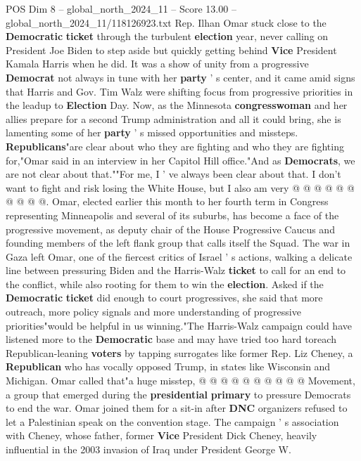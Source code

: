 \begin{textsample}{POS Dim 8 – global\_north\_2024\_11 – Score 13.00 – global\_north\_2024\_11/118126923.txt}  \label{ex:f8_pos_151}
Rep.
Ilhan Omar stuck close to the \textbf{Democratic} \textbf{ticket} through the turbulent \textbf{election} year, never calling on President Joe Biden to step aside but quickly getting behind \textbf{Vice} President Kamala Harris when he did.
It was a show of unity from a progressive \textbf{Democrat} not always in tune with her \textbf{party} ' s center, and it came amid signs that Harris and Gov.
Tim Walz were shifting focus from progressive priorities in the leadup to \textbf{Election} Day.
Now, as the Minnesota \textbf{congresswoman} and her allies prepare for a second Trump administration and all it could bring, she is lamenting some of her \textbf{party} ' s missed opportunities and missteps. \textbf{Republicans}"are clear about who they are fighting and who they are fighting for,"Omar said in an interview in her Capitol Hill office."And as \textbf{Democrats}, we are not clear about that.""For me, I ' ve always been clear about that.
I don't want to fight and risk losing the White House, but I also am very @ @ @ @ @ @ @ @ @ @.
Omar, elected earlier this month to her fourth term in Congress representing Minneapolis and several of its suburbs, has become a face of the progressive movement, as deputy chair of the House Progressive Caucus and founding members of the left flank group that calls itself the Squad.
The war in Gaza left Omar, one of the fiercest critics of Israel ' s actions, walking a delicate line between pressuring Biden and the Harris-Walz \textbf{ticket} to call for an end to the conflict, while also rooting for them to win the \textbf{election}.
Asked if the \textbf{Democratic} \textbf{ticket} did enough to court progressives, she said that more outreach, more policy signals and more understanding of progressive priorities"would be helpful in us winning."The Harris-Walz campaign could have listened more to the \textbf{Democratic} base and may have tried too hard toreach Republican-leaning \textbf{voters} by tapping surrogates like former Rep.
Liz Cheney, a \textbf{Republican} who has vocally opposed Trump, in states like Wisconsin and Michigan.
Omar called that"a huge misstep, @ @ @ @ @ @ @ @ @ @ Movement, a group that emerged during the \textbf{presidential} \textbf{primary} to pressure Democrats to end the war.
Omar joined them for a sit-in after \textbf{DNC} organizers refused to let a Palestinian speak on the convention stage.
The campaign ' s association with Cheney, whose father, former \textbf{Vice} President Dick Cheney, heavily influential in the 2003 invasion of Iraq under President George W.

\end{textsample}
